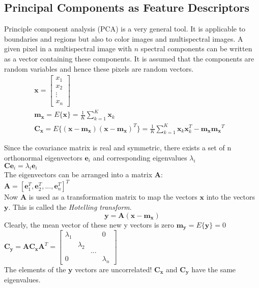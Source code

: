 \subsection{Principal Components as Feature Descriptors}
Principle component analysis (PCA) is a very general tool. It is applicable to boundaries and regions but also to color images and multispectral images. A given pixel in a multispectral image with $n$ spectral components can be written as a vector containing these components. It is assumed that the components are random variables and hence these pixels are random vectors.
\begin{align*}
& \mathbf{x} = \left[\begin{array}{c} x_1 \\ x_2 \\ \vdots \\ x_n \end{array}\right]&&\\
& \mathbf{m_x} = E\{\mathbf{x}\} = \frac{1}{K}\sum\limits_{k=1}^{K}\mathbf{x}_k&&\\
& \mathbf{C_x} = E\{(\mathbf{x}-\mathbf{m_x})(\mathbf{x}-\mathbf{m_x})^T\}=\frac{1}{K}\sum\limits_{k=1}^{K}\mathbf{x}_k\mathbf{x}_k^T-\mathbf{m_x}\mathbf{m_x}^T
\end{align*}

Since the covariance matrix is real and symmetric, there exists a set of n orthonormal eigenvectors $\mathbf{e}_i$ and corresponding eigenvalues $\lambda_i$\\
$\mathbf{C}\mathbf{e}_i=\lambda_i\mathbf{e}_i$\\
The eigenvectors can be arranged into a matrix $\mathbf{A}$:\\
$\mathbf{A}=[\mathbf{e}_1^T, \mathbf{e}_2^T, ..., \mathbf{e}_n^T]^T$\\
Now $\mathbf{A}$ is used as a transformation matrix to map the vectors $\mathbf{x}$ into the vectors $\mathbf{y}$. This is called the \emph{Hotelling transform}. \\
	\[
		\mathbf{y}=\mathbf{A}(\mathbf{x}-\mathbf{m_x})
	\]
Clearly, the mean vector of these new y vectors is zero $\mathbf{m_y}=E\{\mathbf{y}\}=0$\\
$\mathbf{C_y}=\mathbf{AC_xA}^T=\left[
\begin{matrix}
 \lambda_1 & & & 0 \\
 & \lambda_2 & & \\
 & & ... & \\
 0 & & & \lambda_n
\end{matrix}\right]	$\\
The elements of the $\mathbf{y}$ vectors are uncorrelated! $\mathbf{C_x}$ and $\mathbf{C_y}$ have the same eigenvalues.

